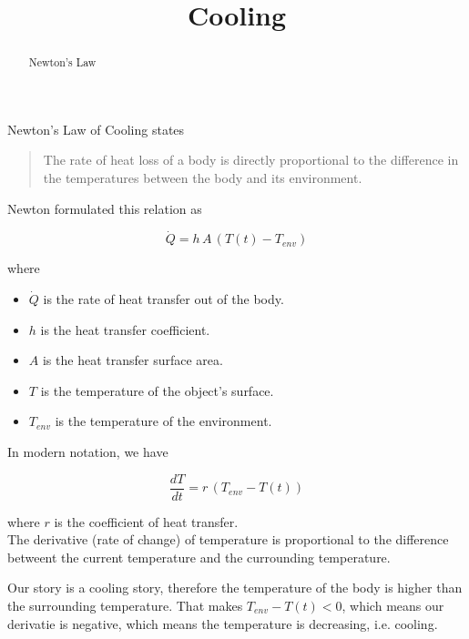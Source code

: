 \documentclass{ximera}
\title{Cooling}
\begin{document}
\begin{abstract}
  Newton's Law
\end{abstract}
\maketitle




Newton's Law of Cooling states



\begin{quote}


The rate of heat loss of a body is directly proportional to the difference in the temperatures between the body and its environment. 
\end{quote}



Newton formulated this relation as 

\[
\dot{Q} = h \, A \, (T(t) - T_{env})
\]


where


\begin{itemize}
\item $\dot{Q}$ is the rate of heat transfer out of the body.
\item $h$ is the  heat transfer coefficient.
\item $A$ is the heat transfer surface area.
\item $T$ is the temperature of the object's surface.
\item $T_{env}$ is the temperature of the environment.
\end{itemize}



In modern notation, we have

\[
\frac{dT}{dt} = r \, (T_{env} - T(t))
\]

where $r$ is the coefficient of heat transfer.\\





The derivative (rate of change) of temperature is proportional to the difference betweent the current temperature and the currounding temperature.


\begin{observation}


Our story is a cooling story, therefore the temperature of the body is higher than the surrounding temperature.  That makes $T_{env} - T(t) < 0$, which means our derivatie is negative, which means the temperature is decreasing, i.e. cooling.
\end{observation}
\end{document}
